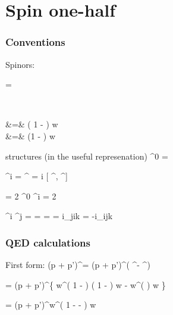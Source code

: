 \chapter{Spin one-half}


\subsection{Conventions}
Spinors:

\beq
	\sr = \begin{pmatrix} \eta \\ \xi \end{pmatrix}
\eeq

\beqa
	\eta &=& \left( 1  -  \right ) w	\\
	\xi &=& 	 \left(1 -  \right ) w	\\
\eeqa

structures (in the useful represenation)
\beq
	\gamma^0 = 
\eeq

\beq
	\gamma^i = 
\eeq	
\beq
	\sigma^{\mu \nu} = i  [ \gamma^\mu, \gamma^\nu]
\eeq

 = 2 \gamma^0 \gamma^i = 2  
\eeq


\beq
	\gamma^i \gamma^j =  
		=	
\eeq
{} = 
		=	i\epsilon_{jik} 
		=	-i\epsilon_{ijk} 
\eeq

\subsection{QED calculations}
First form:
\beq
	(p + p')^\mu \srb \sr  = (p + p')^\mu \left( \eta^\dagger \eta - \xi^\dagger \xi \right ) 
\eeq

\beq
	= (p + p')^\mu \left \{
		w^\dagger \left( 1 -  \right )  \left( 1 -  \right ) w
		- w^\dagger \left(   \right ) w \right \}
\eeq 

\beq
	= (p + p')^\mu w^\dagger \left( 
		1 -   - \frac{ \gv{\sigma} \cdot \v{p'} \gv{\sigma} \cdot \v{p} }{4m^2} 
		\right ) w
\eeq


